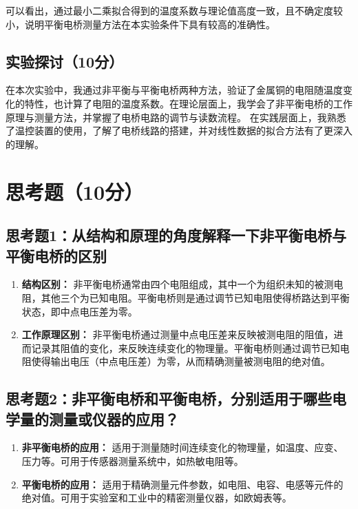 \documentclass[]{../template/Report}%
\begin{document}
\begin{fullreportonly}
可以看出，通过最小二乘拟合得到的温度系数与理论值高度一致，且不确定度较小，说明平衡电桥测量方法在本实验条件下具有较高的准确性。

\subsection{实验探讨（10分）}

在本次实验中，我通过非平衡与平衡电桥两种方法，验证了金属铜的电阻随温度变化的特性，也计算了电阻的温度系数。在理论层面上，我学会了非平衡电桥的工作原理与测量方法，并掌握了电桥电路的调节与读数流程。
在实践层面上，我熟悉了温控装置的使用，了解了电桥线路的搭建，并对线性数据的拟合方法有了更深入的理解。


\section{思考题（10分）}

\subsection{思考题1：从结构和原理的角度解释一下非平衡电桥与平衡电桥的区别}
\begin{enumerate}[label=(\arabic*).,leftmargin=3em]
    \item \textbf{结构区别：} 非平衡电桥通常由四个电阻组成，其中一个为组织未知的被测电阻，其他三个为已知电阻。平衡电桥则是通过调节已知电阻使得桥路达到平衡状态，即中点电压差为零。
    \item \textbf{工作原理区别：} 非平衡电桥通过测量中点电压差来反映被测电阻的阻值，进而记录其阻值的变化，来反映连续变化的物理量。平衡电桥则通过调节已知电阻使得输出电压（中点电压差）为零，从而精确测量被测电阻的绝对值。
\end{enumerate}
\subsection{思考题2：非平衡电桥和平衡电桥，分别适用于哪些电学量的测量或仪器的应用？}
\begin{enumerate}[label=(\arabic*).,leftmargin=3em]
    \item \textbf{非平衡电桥的应用：} 适用于测量随时间连续变化的物理量，如温度、应变、压力等。可用于传感器测量系统中，如热敏电阻等。
    \item \textbf{平衡电桥的应用：} 适用于精确测量元件参数，如电阻、电容、电感等元件的绝对值。可用于实验室和工业中的精密测量仪器，如欧姆表等。
\end{enumerate}

\end{fullreportonly}
\insertnotes
\end{document}
